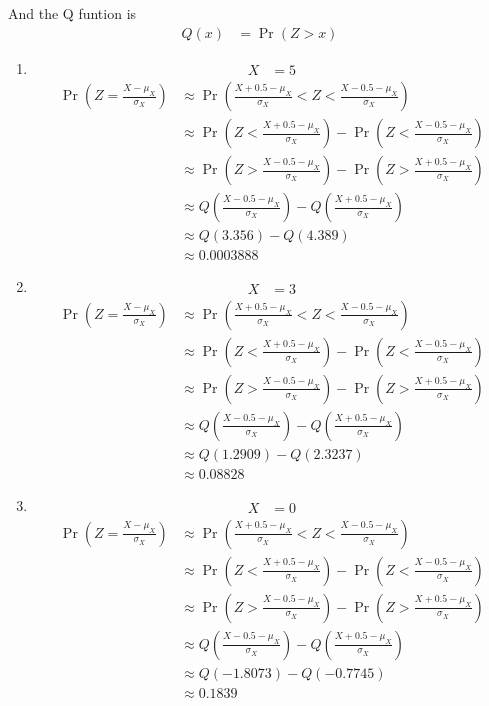 \documentclass[journal,11pt,onecolumn]{IEEEtran}
\providecommand{\pr}[1]{\ensuremath{\Pr\left(#1\right)}}
\providecommand{\qfunc}[1]{\ensuremath{Q\left(#1\right)}}
\providecommand{\pr}[1]{\ensuremath{\Pr\left(#1\right)}}
\providecommand{\qfunc}[1]{\ensuremath{Q\left(#1\right)}}
\providecommand{\qfunc}[1]{\ensuremath{Q\left(#1\right)}}
\begin{document}
And the Q funtion is 
\begin{align}
	\qfunc{x}&=\pr{Z >x}
\end{align}
\begin{enumerate}
	\item 
	\begin{align}
		X&=5
	\end{align}
	\begin{align}
	\pr{Z=\frac{X-\mu_X}{\sigma_X}} &\approx \pr{\frac{X+0.5-\mu_X}{\sigma_X} < Z < \frac{X-0.5-\mu_X}{\sigma_X}}\\
	&\approx \pr{Z<\frac{X+0.5-\mu_X}{\sigma_X}} - \pr{Z<\frac{X-0.5-\mu_X}{\sigma_X}}\\
	&\approx \pr{Z>\frac{X-0.5-\mu_X}{\sigma_X}} - \pr{Z>\frac{X+0.5-\mu_X}{\sigma_X}}\\
	&\approx \qfunc{\frac{X-0.5-\mu_X}{\sigma_X}} - \qfunc{\frac{X+0.5-\mu_X}{\sigma_X}}\\
	&\approx \qfunc{3.356} - \qfunc{4.389}\\
	&\approx 0.0003888
	\end{align}
	\item 
	\begin{align}
		X&=3
	\end{align}
	\begin{align}
	\pr{Z=\frac{X-\mu_X}{\sigma_X}} &\approx \pr{\frac{X+0.5-\mu_X}{\sigma_X} < Z < \frac{X-0.5-\mu_X}{\sigma_X}}\\
	&\approx \pr{Z<\frac{X+0.5-\mu_X}{\sigma_X}} - \pr{Z<\frac{X-0.5-\mu_X}{\sigma_X}}\\
	&\approx \pr{Z>\frac{X-0.5-\mu_X}{\sigma_X}} - \pr{Z>\frac{X+0.5-\mu_X}{\sigma_X}}\\
	&\approx \qfunc{\frac{X-0.5-\mu_X}{\sigma_X}} - \qfunc{\frac{X+0.5-\mu_X}{\sigma_X}}\\
	&\approx \qfunc{1.2909} - \qfunc{2.3237}\\
	&\approx 0.08828
	\end{align}
	\item 
	\begin{align}
		X&=0
	\end{align}
	\begin{align}
	\pr{Z=\frac{X-\mu_X}{\sigma_X}} &\approx \pr{\frac{X+0.5-\mu_X}{\sigma_X} < Z < \frac{X-0.5-\mu_X}{\sigma_X}}\\
	&\approx \pr{Z<\frac{X+0.5-\mu_X}{\sigma_X}} - \pr{Z<\frac{X-0.5-\mu_X}{\sigma_X}}\\
	&\approx \pr{Z>\frac{X-0.5-\mu_X}{\sigma_X}} - \pr{Z>\frac{X+0.5-\mu_X}{\sigma_X}}\\
	&\approx \qfunc{\frac{X-0.5-\mu_X}{\sigma_X}} - \qfunc{\frac{X+0.5-\mu_X}{\sigma_X}}\\
	&\approx \qfunc{-1.8073} - \qfunc{-0.7745}\\
	&\approx 0.1839
	\end{align}
\end{enumerate}
\end{document}
